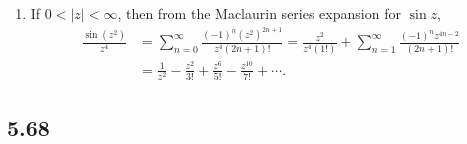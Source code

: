 \documentclass[a4paper,12pt]{article}
\begin{document}
\begin{enumerate}
\begin{enumerate}
            \item
                If $0 < |z| < \infty$, then from the Maclaurin series expansion for $\sin z$,
                \begin{align*}
                    \frac{\sin(z^2)}{z^4} &= \sum_{n = 0}^\infty \frac{(-1)^n (z^2)^{2n + 1}}{z^4 (2n + 1)!} = \frac{z^2}{z^4(1!)} + \sum_{n = 1}^\infty \frac{(-1)^n z^{4n - 2}}{(2n + 1)!} \\
                    &= \frac{1}{z^2} - \frac{z^2}{3!} + \frac{z^6}{5!} - \frac{z^{10}}{7!} + \cdots.
                \end{align*}
        \end{enumerate}
\end{enumerate}

\subsection*{5.68}
\end{document}
